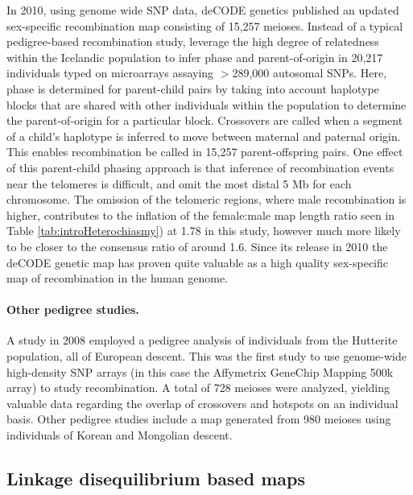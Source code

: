 In 2010, using genome wide SNP data, deCODE genetics published an updated sex-specific recombination map consisting of 15,257 meioses\cite{Kong2010}.
Instead of a typical pedigree-based recombination study, \citet{Kong2010} leverage the high degree of relatedness within the Icelandic population to infer phase and parent-of-origin in 20,217 individuals typed on microarrays assaying $>$289,000 autosomal SNPs.
Here, phase is determined for parent-child pairs by taking into account haplotype blocks that are shared with other individuals within the population to determine the parent-of-origin for a particular block.
Crossovers are called when a segment of a child's haplotype is inferred to move between maternal and paternal origin.
This enables recombination be called in 15,257 parent-offspring pairs.
One effect of this parent-child phasing approach is that inference of recombination events near the telomeres is difficult, and \citet{Kong2010} omit the most distal 5 Mb for each chromosome.
The omission of the telomeric regions, where male recombination is higher, contributes to the inflation of the female:male map length ratio seen in Table \ref{tab:introHeterochiasmy}) at 1.78 in this study, however much more likely to be closer to the consensus ratio of around 1.6.
Since its release in 2010 the deCODE genetic map has proven quite valuable as a high quality sex-specific map of recombination in the human genome.


\paragraph{Other pedigree studies.}
A study in 2008 employed a pedigree analysis of individuals from the Hutterite population, all of European descent\cite{Coop2008}.
This was the first study to use genome-wide high-density SNP arrays (in this case the Affymetrix GeneChip Mapping 500k array) to study recombination.
A total of 728 meioses were analyzed, yielding valuable data regarding the overlap of crossovers and hotspots on an individual basis.
Other pedigree studies include a map generated from 980 meioses using individuals of Korean and Mongolian descent\cite{Bleazard2013}.

\subsection{Linkage disequilibrium based maps}


